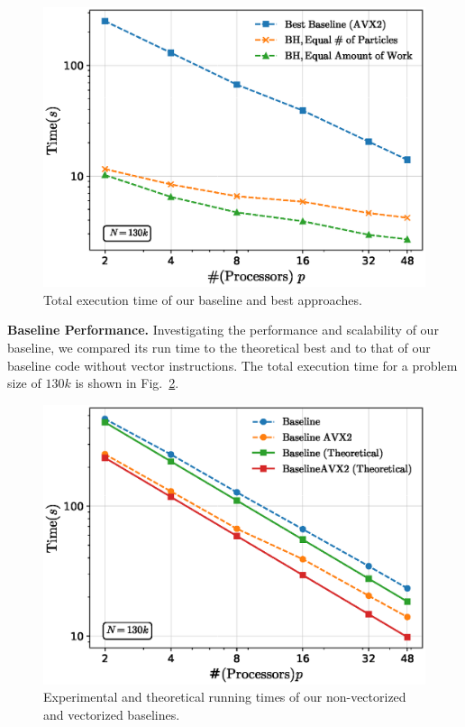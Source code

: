 \documentclass[letterpaper]{article}
\newcommand{\mypar}[1]{{\bf #1.}}
\begin{document}
\begin{figure}[h]
 \centering
  \caption{Total execution time of our baseline and best approaches.\label{overview}}
  \includegraphics[scale=0.4]{figs/130kComparison.eps}
\end{figure}

\mypar{Baseline Performance}
Investigating the performance and scalability of our baseline, we compared its run time to the theoretical best and to that of our baseline code without vector instructions. The total execution time for a problem size of $130k$ is shown in Fig.~\ref{totalAVX}.

\begin{figure}[h]
 \centering
  \includegraphics[scale=0.4]{figs/total.eps}
  \caption{Experimental and theoretical running times of our non-vectorized and vectorized baselines.\label{totalAVX}}
\end{figure}
\end{document}
